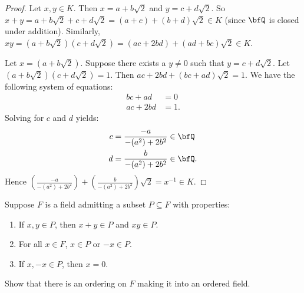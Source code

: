 \documentclass[10pt,twoside,openany]{memoir}
\begin{document}
        \begin{proof}
            Let $x,y \in K$. Then $x = a+b\sqrt{2}$ and $y = c+d\sqrt{2}$. So $x + y = a+b\sqrt{2} + c + d\sqrt{2} = (a+c) + (b+d)\sqrt{2} \in K$ (since $\bfQ$ is closed under addition). Similarly, $xy = (a+b\sqrt{2})(c+d\sqrt{2}) = (ac+2bd) + (ad+bc)\sqrt{2} \in K$.

            Let $x = (a+b\sqrt{2})$. Suppose there exists a $y \neq 0$ such that $y = c+d\sqrt{2}$. Let $(a+b\sqrt{2})(c+d\sqrt{2}) = 1$. Then $ac + 2bd + (bc  + ad)\sqrt{2} = 1$. We have the following system of equations:
                \begin{equation*}
                \begin{split}
                    bc + ad &= 0 \\
                    ac+2bd &= 1.
                \end{split}
                \end{equation*}
            Solving for $c$ and $d$ yields:
                \begin{equation*}
                \begin{split}
                    c &= \frac{-a}{-(a^2)+2b^2} \in \bfQ\\
                    d &= \frac{b}{-(a^2)+2b^2} \in \bfQ.
                \end{split}
                \end{equation*}
            Hence $\displaystyle\left(\frac{-a}{-(a^2)+2b^2}\right) + \left(\frac{b}{-(a^2)+2b^2}\right)\sqrt{2} = x^{-1} \in K$.
        \end{proof}
    \begin{exercise}
        Suppose $F$ is a field admitting a subset $P \subseteq F$ with properties:
            \begin{enumerate}[label = (\arabic*)]
                \item If $x,y \in P$, then $x+y \in P$ and $xy \in P$.
                \item For all $x \in F$, $x \in P$ or $-x \in P$.
                \item If $x, -x \in P$, then $x=0$. 
            \end{enumerate}
        Show that there is an ordering on $F$ making it into an ordered field.
    \end{exercise}
\end{document}
